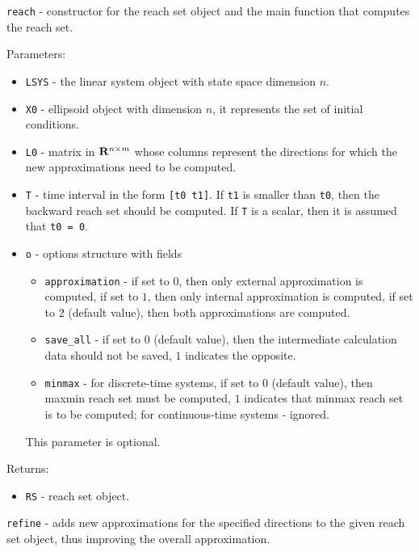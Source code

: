 \documentclass{report}
\begin{document}
\newpage

{\Large {\tt reach}} - constructor for the reach set object and the main
function that computes the reach set.

Parameters:
\begin{itemize}
\item {\tt LSYS} - the linear system object with state space dimension $n$.
\item {\tt X0} - ellipsoid object with dimension $n$, it represents
the set of initial conditions.
\item {\tt L0} - matrix in ${\bf R}^{n\times m}$ whose columns represent the
directions for which the new approximations need to be computed.
\item {\tt T} - time interval in the form {\tt [t0 t1]}. If {\tt t1} is
smaller than {\tt t0}, then the backward reach set should be computed.
If {\tt T} is a scalar, then it is assumed that {\tt t0 = 0}.
\item {\tt o} - options structure with fields
\begin{itemize}
\item {\tt approximation} - if set to $0$, then only external approximation
is computed, if set to $1$, then only internal approximation is computed,
if set to $2$ (default value), then both approximations are computed.
\item {\tt save\_all} - if set to $0$ (default value), then the intermediate
calculation data should not be saved, $1$ indicates the opposite.
\item {\tt minmax} - for discrete-time systems, if set to $0$ (default value),
then maxmin reach set must be computed, $1$ indicates that minmax reach set is
to be computed; for continuous-time systems - ignored.
\end{itemize}
This parameter is optional.
\end{itemize}

Returns:
\begin{itemize}
\item {\tt RS} - reach set object.
\end{itemize}

\newpage

{\Large {\tt refine}} - adds new approximations for the specified directions
to the given reach set object, thus improving the overall approximation.
\end{document}
